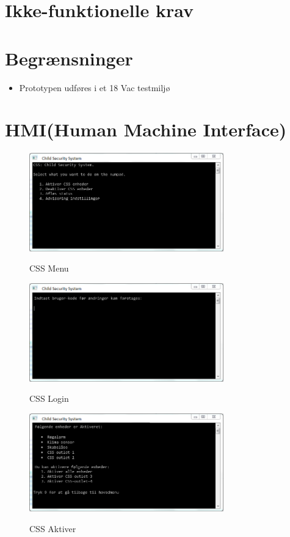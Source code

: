 \section{Ikke-funktionelle krav}



\section{Begrænsninger}
\begin{itemize}
\item Prototypen udføres i et 18 Vac testmiljø
\end{itemize}

\newpage
\section{HMI(Human Machine Interface)}

\begin{figure}[h] \centering
{\includegraphics[width=0.75\textwidth]{billeder/cmdprompt/CSS_menu}}
\caption{CSS Menu}
\end{figure}

\begin{figure}[h] \centering
{\includegraphics[width=0.75\textwidth]{billeder/cmdprompt/CSS_login}}
\caption{CSS Login}
\end{figure}

\begin{figure}[h] \centering
{\includegraphics[width=0.75\textwidth]{billeder/cmdprompt/CSS_aktiver}}
\caption{CSS Aktiver}
\end{figure}


